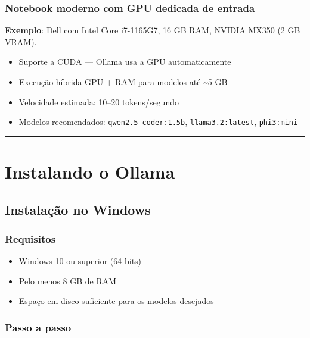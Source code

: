 \documentclass[
]{article}
\providecommand{\tightlist}{%
  \setlength{\itemsep}{0pt}\setlength{\parskip}{0pt}}
\begin{document}
\subsubsection{Notebook moderno com GPU dedicada de
entrada}\label{notebook-moderno-com-gpu-dedicada-de-entrada}

\textbf{Exemplo}: Dell com Intel Core i7-1165G7, 16 GB RAM, NVIDIA MX350
(2 GB VRAM).

\begin{itemize}
\tightlist
\item
  Suporte a CUDA --- Ollama usa a GPU automaticamente
\item
  Execução híbrida GPU + RAM para modelos até \textasciitilde5 GB
\item
  Velocidade estimada: 10--20 tokens/segundo
\item
  Modelos recomendados: \texttt{qwen2.5-coder:1.5b},
  \texttt{llama3.2:latest}, \texttt{phi3:mini}
\end{itemize}

\begin{center}\rule{0.5\linewidth}{0.5pt}\end{center}

\section{Instalando o Ollama}\label{instalando-o-ollama}

\subsection{Instalação no Windows}\label{instalauxe7uxe3o-no-windows}

\subsubsection{Requisitos}\label{requisitos}

\begin{itemize}
\tightlist
\item
  Windows 10 ou superior (64 bits)
\item
  Pelo menos 8 GB de RAM
\item
  Espaço em disco suficiente para os modelos desejados
\end{itemize}

\subsubsection{Passo a passo}\label{passo-a-passo}
\end{document}
